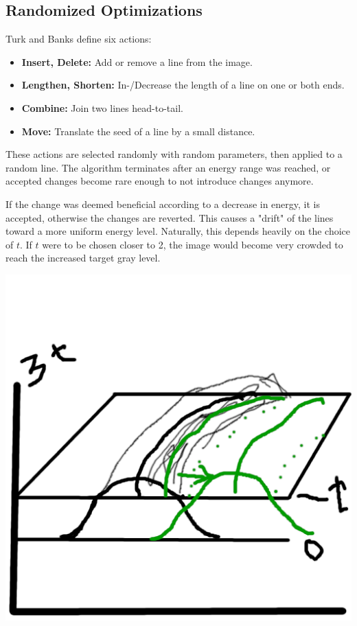 \subsection{Randomized Optimizations}
Turk and Banks define six actions:
\begin{itemize}
    \item \textbf{Insert, Delete:} Add or remove a line from the image.
    \item \textbf{Lengthen, Shorten:} In-/Decrease the length of a line on one or both ends.
    \item \textbf{Combine:} Join two lines head-to-tail.
    \item \textbf{Move:} Translate the seed of a line by a small distance.
\end{itemize}
These actions are selected randomly with random parameters, then applied to a random line.
The algorithm terminates after an energy range was reached, or accepted changes become rare enough to not introduce changes anymore.\\
\begin{minipage}{.55\textwidth}
    \vspace{5pt}
    If the change was deemed beneficial according to a decrease in energy, it is accepted, otherwise the changes are reverted.
    This causes a "drift" of the lines toward a more uniform energy level.
    Naturally, this depends heavily on the choice of $t$. If $t$ were to be chosen closer to 2,
    the image would become very crowded to reach the increased target gray level.
    \vspace{5pt}
\end{minipage}
\begin{minipage}{.45\textwidth}
    \begin{center}
        \includegraphics*{figures/SL_bump1.png}
    \end{center}
    \vspace*{5pt}
\end{minipage}